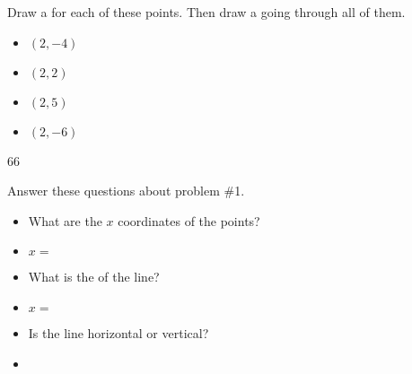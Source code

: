 \documentclass[12pt,letterpaper]{memoir}
\begin{document}
\pagestyle{plain}
\checkandfixthelayout
\raggedbottom


\noindent
{}


%
%
\myProblemsWithContent
{
    Draw a  for each of these points. 
    Then draw a  going through all of them.
    \begin{itemize}[nosep]
        \item $(2,-4)$
        \item $(2,2)$
        \item $(2,5)$
        \item $(2,-6)$
    \end{itemize}
    \vspace{-3\onelineskip}
    \hfill
    \begin{myTikzpictureGrid}{0.35} {6}{6}
    \end{myTikzpictureGrid}
}
{
    Answer these questions about problem \#1. 
    \tcblower 
    \begin{itemize}[fullwidth]
        \item[] What are the $x$ coordinates of the points? 
        \item[] $x =$\\
        \item[] What is the  of the line? 
        \item[] $x =$\\
        \item[] Is the line horizontal or vertical?
        \item[] 
    \end{itemize}
}
\end{document}
